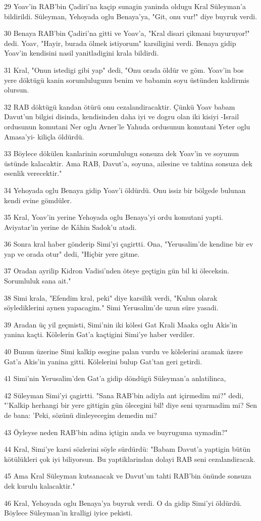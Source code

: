 \par 29 Yoav'in RAB'bin Çadiri'na kaçip sunagin yaninda oldugu Kral Süleyman'a bildirildi. Süleyman, Yehoyada oglu Benaya'ya, "Git, onu vur!" diye buyruk verdi.
\par 30 Benaya RAB'bin Çadiri'na gitti ve Yoav'a, "Kral disari çikmani buyuruyor!" dedi. Yoav, "Hayir, burada ölmek istiyorum" karsiligini verdi. Benaya gidip Yoav'in kendisini nasil yanitladigini krala bildirdi.
\par 31 Kral, "Onun istedigi gibi yap" dedi, "Onu orada öldür ve göm. Yoav'in bos yere döktügü kanin sorumlulugunu benim ve babamin soyu üstünden kaldirmis olursun.
\par 32 RAB döktügü kandan ötürü onu cezalandiracaktir. Çünkü Yoav babam Davut'un bilgisi disinda, kendisinden daha iyi ve dogru olan iki kisiyi -Israil ordusunun komutani Ner oglu Avner'le Yahuda ordusunun komutani Yeter oglu Amasa'yi- kiliçla öldürdü.
\par 33 Böylece dökülen kanlarinin sorumlulugu sonsuza dek Yoav'in ve soyunun üstünde kalacaktir. Ama RAB, Davut'a, soyuna, ailesine ve tahtina sonsuza dek esenlik verecektir."
\par 34 Yehoyada oglu Benaya gidip Yoav'i öldürdü. Onu issiz bir bölgede bulunan kendi evine gömdüler.
\par 35 Kral, Yoav'in yerine Yehoyada oglu Benaya'yi ordu komutani yapti. Aviyatar'in yerine de Kâhin Sadok'u atadi.
\par 36 Sonra kral haber gönderip Simi'yi çagirtti. Ona, "Yerusalim'de kendine bir ev yap ve orada otur" dedi, "Hiçbir yere gitme.
\par 37 Oradan ayrilip Kidron Vadisi'nden öteye geçtigin gün bil ki öleceksin. Sorumluluk sana ait."
\par 38 Simi krala, "Efendim kral, peki" diye karsilik verdi, "Kulun olarak söylediklerini aynen yapacagim." Simi Yerusalim'de uzun süre yasadi.
\par 39 Aradan üç yil geçmisti, Simi'nin iki kölesi Gat Krali Maaka oglu Akis'in yanina kaçti. Kölelerin Gat'a kaçtigini Simi'ye haber verdiler.
\par 40 Bunun üzerine Simi kalkip esegine palan vurdu ve kölelerini aramak üzere Gat'a Akis'in yanina gitti. Kölelerini bulup Gat'tan geri getirdi.
\par 41 Simi'nin Yerusalim'den Gat'a gidip döndügü Süleyman'a anlatilinca,
\par 42 Süleyman Simi'yi çagirtti. "Sana RAB'bin adiyla ant içirmedim mi?" dedi, "'Kalkip herhangi bir yere gittigin gün ölecegini bil! diye seni uyarmadim mi? Sen de bana: 'Peki, sözünü dinleyecegim demedin mi?
\par 43 Öyleyse neden RAB'bin adina içtigin anda ve buyruguma uymadin?"
\par 44 Kral, Simi'ye karsi sözlerini söyle sürdürdü: "Babam Davut'a yaptigin bütün kötülükleri çok iyi biliyorsun. Bu yaptiklarindan dolayi RAB seni cezalandiracak.
\par 45 Ama Kral Süleyman kutsanacak ve Davut'un tahti RAB'bin önünde sonsuza dek kurulu kalacaktir."
\par 46 Kral, Yehoyada oglu Benaya'ya buyruk verdi. O da gidip Simi'yi öldürdü. Böylece Süleyman'in kralligi iyice pekisti.

